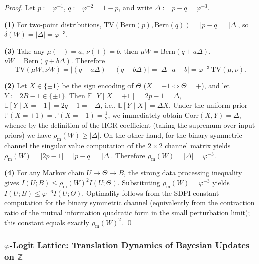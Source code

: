 \begin{proof}
Let \(p:=\varphi^{-1}\), \(q:=\varphi^{-2}=1-p\), and write \(\Delta:=p-q=\varphi^{-3}\).
\par
\textbf{(1)} For two-point distributions, \(\mathrm{TV}(\mathrm{Bern}(p),\mathrm{Bern}(q))=|p-q|=|\Delta|\), so \(\delta(W)=|\Delta|=\varphi^{-3}\).
\par
\textbf{(3)} Take any \(\mu(+)=a\), \(\nu(+)=b\), then
\(
\mu W=\mathrm{Bern}(q+a\Delta)
\), \(
\nu W=\mathrm{Bern}(q+b\Delta)
\).
Therefore
\[
\mathrm{TV}(\mu W,\nu W)=|(q+a\Delta)-(q+b\Delta)|=|\Delta|\,|a-b|=\varphi^{-3}\,\mathrm{TV}(\mu,\nu).
\]
\par
\textbf{(2)} Let \(X\in\{\pm 1\}\) be the sign encoding of \(\Theta\) (\(X=+1\iff \Theta=+\)), and let \(Y:=2B-1\in\{\pm 1\}\).
Then \(\mathbb{E}[Y\mid X=+1]=2p-1=\Delta\), \(\mathbb{E}[Y\mid X=-1]=2q-1=-\Delta\), i.e.,
\(\mathbb{E}[Y\mid X]=\Delta X\).
Under the uniform prior \(\mathbb{P}(X=+1)=\mathbb{P}(X=-1)=\tfrac12\), we immediately obtain
\(\mathrm{Corr}(X,Y)=\Delta\), whence by the definition of the HGR coefficient (taking the supremum over input priors) we have \(\rho_{\mathrm{m}}(W)\ge|\Delta|\).
On the other hand, for the binary symmetric channel the singular value computation of the \(2\times 2\) channel matrix yields \(\rho_{\mathrm{m}}(W)=|2p-1|=|p-q|=|\Delta|\).
Therefore \(\rho_{\mathrm{m}}(W)=|\Delta|=\varphi^{-3}\).
\par
\textbf{(4)} For any Markov chain \(U\to\Theta\to B\), the strong data processing inequality gives
\(
I(U;B)\le \rho_{\mathrm{m}}(W)^2 I(U;\Theta)
\).
Substituting \(\rho_{\mathrm{m}}(W)=\varphi^{-3}\) yields
\(
I(U;B)\le \varphi^{-6} I(U;\Theta)
\).
Optimality follows from the SDPI constant computation for the binary symmetric channel (equivalently from the contraction ratio of the mutual information quadratic form in the small perturbation limit); this constant equals exactly \(\rho_{\mathrm{m}}(W)^2\). \qed
\end{proof}

\subsubsection{\texorpdfstring{$\varphi$}{phi}-Logit Lattice: Translation Dynamics of Bayesian Updates on \texorpdfstring{$\mathbb{Z}$}{Z}}\label{subsubsec:pom-phi-logit-lattice-dynamics}

